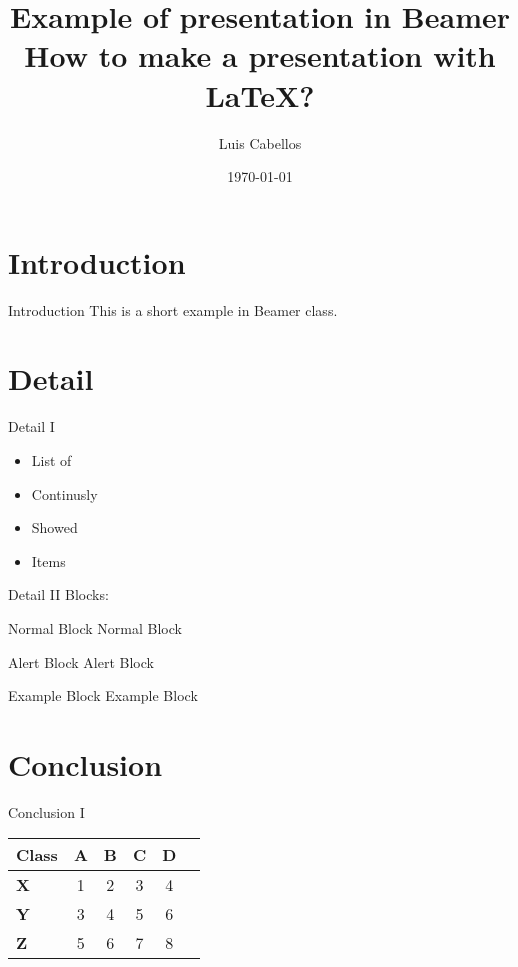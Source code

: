 \documentclass{beamer}
\title[Beamer Presentation]{Example of presentation in Beamer\\How to make a presentation with LaTeX?}
\author{Luis Cabellos}
\institute{IFCA}
\date{\today}
\begin{document}
\begin{frame}
  \titlepage
\end{frame}

\section{Introduction}

\begin{frame}{Introduction}
  This is a short example in Beamer class.
\end{frame}

\section{Detail}

\begin{frame}{Detail I}
  \begin{itemize}[<+->]
  \item List of
  \item Continusly
  \item Showed
  \item Items
  \end{itemize}
\end{frame}

\begin{frame}{Detail II}
  Blocks:
  \pause
  \begin{block}{Normal Block}
    Normal Block
  \end{block}
  \pause
  \begin{alertblock}{Alert Block}
    Alert Block
  \end{alertblock}
  \pause
  \begin{exampleblock}{Example Block}
    Example Block
  \end{exampleblock}
\end{frame}

\section{Conclusion}

\begin{frame}{Conclusion I}
  \begin{center}
    \begin{tabular}{lc<{\onslide<2->}c<{\onslide<3->}c<{\onslide<4->}c<{\onslide}c}
      \bf Class & \bf A & \bf B & \bf C & \bf D \\
      \hline
      \bf X     & 1 & 2 & 3 & 4 \\
      \bf Y     & 3 & 4 & 5 & 6 \\
      \bf Z     &5&6&7&8
    \end{tabular}
  \end{center}
\end{frame}
\end{document}
